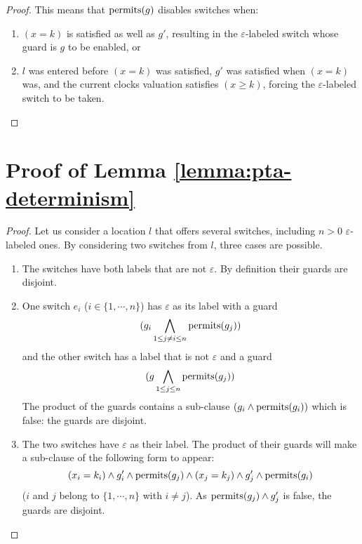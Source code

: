 \begin{proof}
This means that $\operatorname{permits}(g)$ disables switches when:
\begin{enumerate}
  
  \item $(x = k)$ is satisfied as well as $g'$, resulting in the $\varepsilon$-labeled switch whose guard is $g$ to be enabled, or
  
  \item $l$ was entered before $(x = k)$ was satisfied, $g'$ was satisfied when $(x = k)$ was, and the current clocks valuation satisfies $(x \geq k)$, forcing the $\varepsilon$-labeled switch to be taken.
  
\end{enumerate}
\label{proof:mi-enforcement}
\end{proof}


\section{Proof of Lemma \ref{lemma:pta-determinism}}
\label{proof:pta-determinism}


\begin{proof}
Let us consider a location $l$ that offers several switches, including $n > 0$ $\varepsilon$-labeled ones. By considering two switches from $l$, three cases are possible.
\begin{enumerate}

	\item The switches have both labels that are not $\varepsilon$. By definition their guards are disjoint.
	
	\item One switch $e_i$ ($i \in \{1, \cdots, n\}$) has $\varepsilon$ as its label with a guard
	$$(g_i \bigwedge\limits_{1 \leq j \neq i \leq n} \operatorname{permits}(g_j))$$
	and the other switch has a label that is not $\varepsilon$ and a guard
	$$(g \bigwedge\limits_{1 \leq j \leq n} \operatorname{permits}(g_j))$$
	The product of the guards contains a sub-clause $(g_i \wedge \operatorname{permits}(g_i))$ which is false: the guards are disjoint.
	
	\item The two switches have $\varepsilon$ as their label. The product of their guards will make a sub-clause of the following form to appear:
	$$(x_i = k_i) \wedge g_i' \wedge \operatorname{permits}(g_j) \wedge (x_j = k_j) \wedge g_j' \wedge \operatorname{permits}(g_i)$$
	($i$ and $j$ belong to $\{1, \cdots, n\}$ with $i \neq j$). As $\operatorname{permits}(g_j) \wedge g_j'$ is false, the guards are disjoint.

\end{enumerate}
\end{proof}

